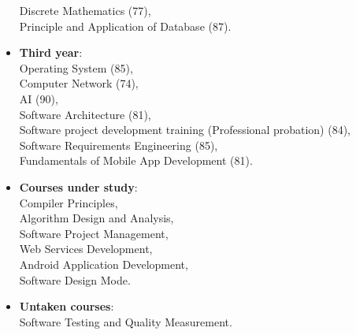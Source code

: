 \begin{itemize}
		\hspace*{2em}Discrete Mathematics (77), \\
		\hspace*{2em}Principle and Application of Database (87).\\
	\item \textbf{Third year}: \\
		\hspace*{2em}Operating System (85), \\
		\hspace*{2em}Computer Network (74), \\
		\hspace*{2em}AI (90), \\
		\hspace*{2em}Software Architecture (81), \\
		\hspace*{2em}Software project development training (Professional probation) (84), \\
		\hspace*{2em}Software Requirements Engineering (85), \\
		\hspace*{2em}Fundamentals of Mobile App Development (81).\\
	\item \textbf{Courses under study}: \\
		\hspace*{2em}Compiler Principles, \\
		\hspace*{2em}Algorithm Design and Analysis, \\
		\hspace*{2em}Software Project Management, \\
		\hspace*{2em}Web Services Development, \\
		\hspace*{2em}Android Application Development, \\
		\hspace*{2em}Software Design Mode.\\
	\item \textbf{Untaken courses}: \\
		\hspace*{2em}Software Testing and Quality Measurement.\\
\end{itemize}